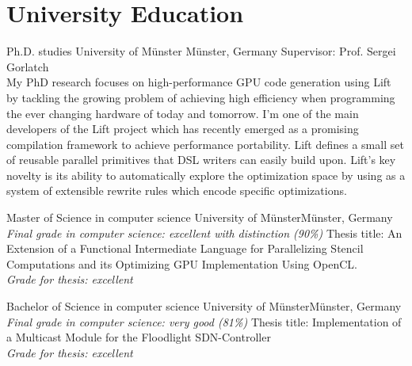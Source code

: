 \documentclass[11pt,a4paper,sans]{moderncv}        %
\begin{document}
\nocite{*}
\makecvtitle

\section{University Education}
					{Ph.D. studies}
					{University of Münster}
					{Münster, Germany}{}
					{Supervisor: Prof. Sergei Gorlatch \\
                     My PhD research focuses on high-performance GPU code generation using Lift by tackling the growing problem of achieving high efficiency when programming the ever changing hardware of today and tomorrow.
                     I'm one of the main developers of the Lift project which has recently emerged as a promising compilation framework to achieve performance portability.
                     Lift defines a small set of reusable parallel primitives that DSL writers can easily build upon.
                     Lift’s key novelty is its ability to automatically explore the optimization space by using as a system of extensible rewrite rules which encode specific optimizations.
					}

					{Master of Science in computer science}
					{University of Münster}{Münster, Germany}
					{\textit{Final grade in computer science: excellent with distinction (90\%)}}
					{Thesis title: An Extension of a Functional Intermediate Language for Parallelizing
					 Stencil Computations and its Optimizing GPU Implementation Using OpenCL.\\
					 \textit{Grade for thesis: excellent}
					}

					{Bachelor of Science in computer science}
					{University of Münster}{Münster, Germany}
					{\textit{Final grade in computer science: very good (81\%)}}
					{Thesis title: Implementation of a Multicast Module for the Floodlight SDN-Controller \\
					 \textit{Grade for thesis: excellent}
					}
\end{document}
